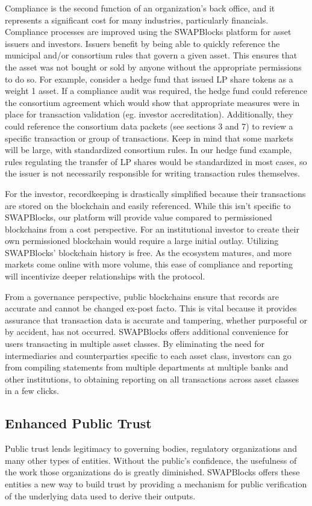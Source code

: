 \documentclass[12pt]{article}
\begin{document}
Compliance is the second function of an organization’s back office, and it represents a significant cost for many industries, 
particularly financials. Compliance processes are improved using the SWAPBlocks platform for asset issuers and investors. 
Issuers benefit by being able to quickly reference the municipal and/or consortium rules that govern a given asset. This 
ensures that the asset was not bought or sold by anyone without the appropriate permissions to do so. For example, consider a 
hedge fund that issued LP share tokens as a weight 1 asset. If a compliance audit was required, the hedge fund could reference the 
consortium agreement which would show that appropriate measures were in place for transaction validation (eg. investor accreditation).
Additionally, they could reference 
the consortium data packets (see sections 3 and 7) to review a specific transaction or group of transactions. Keep in mind that some 
markets will be large, with standardized consortium rules. In our hedge fund example, rules regulating the transfer of LP shares would 
be standardized in most cases, so the issuer is not necessarily responsible for writing transaction rules themselves. 

For the investor, recordkeeping is drastically simplified because their transactions are stored on the blockchain and easily referenced. 
While this isn’t specific to SWAPBlocks, our platform will provide value compared to permissioned blockchains from a cost perspective. 
For an institutional investor to create their own permissioned blockchain would require a large initial outlay. Utilizing SWAPBlocks’ 
blockchain history is free. As the ecosystem matures, and more markets come online with more volume, this ease of compliance and 
reporting will incentivize deeper relationships with the protocol.

From a governance perspective, public blockchains ensure that records are accurate and cannot be changed ex-post facto. This is vital 
because it provides assurance that transaction data is accurate and tampering, whether purposeful or by accident, has not occurred. 
SWAPBlocks offers additional convenience for users transacting in multiple asset classes. By eliminating the need for intermediaries and 
counterparties specific to each asset class, investors can go from compiling statements from multiple departments at multiple banks and 
other institutions, to obtaining reporting on all transactions across asset classes in a few clicks.

\subsection{Enhanced Public Trust}
Public trust lends legitimacy to governing bodies, regulatory organizations and many other types of entities. 
Without the public’s confidence, the usefulness of the work those organizations do is greatly diminished. SWAPBlocks 
offers these entities a new way to build trust by providing a mechanism for public verification of the underlying data used to derive their outputs.
\end{document}

